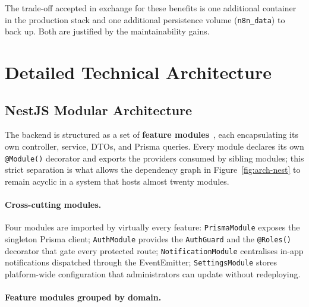 \documentclass[12pt, a4paper, oneside]{report}
\begin{document}
The trade-off accepted in exchange for these benefits is one additional
container in the production stack and one additional persistence volume
(\texttt{n8n\_data}) to back up. Both are justified by the maintainability
gains.

\section{Detailed Technical Architecture}

\subsection{NestJS Modular Architecture}

The backend is structured as a set of \textbf{feature
modules}~\cite{nestjs}, each
encapsulating its own controller, service, DTOs, and Prisma queries.
Every module declares its own \texttt{@Module()} decorator and exports
the providers consumed by sibling modules; this strict separation is
what allows the dependency graph in Figure~\ref{fig:arch-nest} to remain
acyclic in a system that hosts almost twenty modules.

\paragraph{Cross-cutting modules.}
Four modules are imported by virtually every feature:
\texttt{PrismaModule} exposes the singleton Prisma client;
\texttt{AuthModule} provides the \texttt{AuthGuard} and the
\texttt{@Roles()} decorator that gate every protected route;
\texttt{NotificationModule} centralises in-app notifications dispatched
through the EventEmitter;
\texttt{SettingsModule} stores platform-wide configuration that
administrators can update without redeploying.

\paragraph{Feature modules grouped by domain.}
\end{document}
